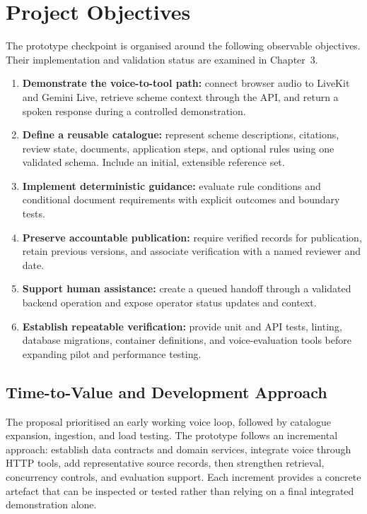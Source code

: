 \documentclass[11pt,a4paper,oneside]{report}
\begin{document}
\section{Project Objectives}
The prototype checkpoint is organised around the following observable objectives.
Their implementation and validation status are examined in Chapter~3.
\begin{enumerate}
  \item \textbf{Demonstrate the voice-to-tool path:} connect browser audio to
    LiveKit and Gemini Live, retrieve scheme context through the API, and return
    a spoken response during a controlled demonstration.
  \item \textbf{Define a reusable catalogue:} represent scheme descriptions,
    citations, review state, documents, application steps, and optional rules
    using one validated schema. Include an initial, extensible reference set.
  \item \textbf{Implement deterministic guidance:} evaluate rule conditions and
    conditional document requirements with explicit outcomes and boundary tests.
  \item \textbf{Preserve accountable publication:} require verified records for
    publication, retain previous versions, and associate verification with a
    named reviewer and date.
  \item \textbf{Support human assistance:} create a queued handoff through a
    validated backend operation and expose operator status updates and context.
  \item \textbf{Establish repeatable verification:} provide unit and API tests,
    linting, database migrations, container definitions, and voice-evaluation
    tools before expanding pilot and performance testing.
\end{enumerate}

\subsection{Time-to-Value and Development Approach}
The proposal prioritised an early working voice loop, followed by catalogue
expansion, ingestion, and load testing. The prototype follows an incremental
approach: establish data contracts and domain services, integrate voice through
HTTP tools, add representative source records, then strengthen retrieval,
concurrency controls, and evaluation support. Each increment provides a concrete
artefact that can be inspected or tested rather than relying on a final integrated
demonstration alone.
\end{document}
